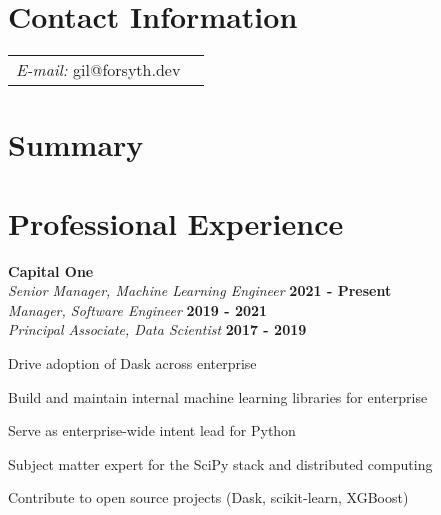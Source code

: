 \documentclass[margin,line]{res}
\newenvironment{list1}{
  \begin{list}{\ding{113}}{%
      \setlength{\itemsep}{0in}
      \setlength{\parsep}{0in} \setlength{\parskip}{0in}
      \setlength{\topsep}{0in} \setlength{\partopsep}{0in}
      \setlength{\leftmargin}{0.17in}}}{\end{list}}
\begin{document}
\newcommand{\link}[1]{\texttt{#1}}
\providecommand{\tightlist}{%
      \setlength{\itemsep}{0pt}\setlength{\parskip}{0pt}}



\begin{resume}
\section{\sc Contact Information}
\vspace{.05in}
\begin{tabular}{@{}p{2in}p{4in}}
{\it E-mail:}  gil@forsyth.dev
\end{tabular}


\section{\sc Summary}



\section{\sc Professional Experience}

{\bf Capital One } \\
{\em Senior Manager, Machine Learning Engineer } \hfill {\bf 2021 - Present}\\
{\em Manager, Software Engineer } \hfill {\bf 2019 - 2021}\\
{\em Principal Associate, Data Scientist } \hfill {\bf 2017 - 2019}\\
\vspace*{-.1in}
\begin{list1}
\item[] Drive adoption of Dask across enterprise
\item[] Build and maintain internal machine learning libraries for enterprise
\item[] Serve as enterprise-wide intent lead for Python
\item[] Subject matter expert for the SciPy stack and distributed computing
\item[] Contribute to open source projects (Dask, scikit-learn, XGBoost)
\end{list1}


\end{resume}
\end{document}
